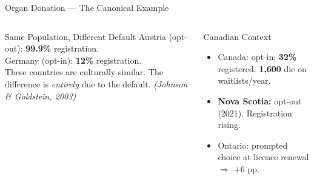 \documentclass[aspectratio=169]{beamer}
\begin{document}
\begin{frame}{Organ Donation --- The Canonical Example}
\begin{columns}
\begin{alertblock}{Same Population, Different Default}
Austria (opt-out): \textbf{99.9\%} registration.\\
Germany (opt-in): \textbf{12\%} registration.\\[0.3em]
These countries are culturally similar. The difference is \textit{entirely} due to the default. \textit{(Johnson \& Goldstein, 2003)}
\end{alertblock}
\begin{block}{Canadian Context}
\begin{itemize}\small
  \item Canada: opt-in; \textbf{32\%} registered. \textbf{1,600} die on waitlists/year.
  \item \textbf{Nova Scotia:} opt-out (2021). Registration rising.
  \item Ontario: prompted choice at licence renewal $\Rightarrow$ $+$6 pp.
\end{itemize}
\end{block}
\end{columns}
\end{frame}
\end{document}
